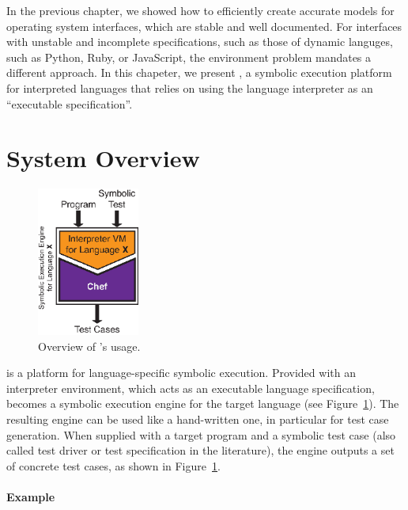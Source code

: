 In the previous chapter, we showed how to efficiently create accurate models for operating system interfaces, which are stable and well documented.
%
For interfaces with unstable and incomplete specifications, such as those of dynamic languges, such as Python, Ruby, or JavaScript, the environment problem mandates a different approach.
%
In this chapeter, we present \chef, a symbolic execution platform for interpreted languages that relies on using the language interpreter as an ``executable specification''.

\section{System Overview}

\begin{figure}
  \centering
  \includegraphics[width=0.3\textwidth]{figures/chef/usage-model}
  \caption{Overview of \chef's usage.}
  \label{fig:chef:overview}
\end{figure}

\chef is a platform for language-specific symbolic execution.
%
Provided with an interpreter environment, which acts as an executable language specification, \chef becomes a symbolic execution engine for the target language (see Figure~\ref{fig:chef:overview}).
%
The resulting engine can be used like a hand-written one, in particular for test case generation.  When supplied with a target program and a symbolic test case (also called test driver or test specification in the literature), the \chef engine outputs a set of concrete test cases, as shown in Figure~\ref{fig:chef:overview}.

\paragraph{Example}

